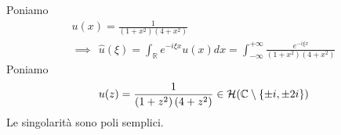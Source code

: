 Poniamo
\begin{gather*}
u( x) =\frac{1}{\left( 1+x^{2}\right)\left( 4+x^{2}\right)}\\
\implies \ \ \hat{u}( \xi ) =\int _{\mathbb{R}} e^{-i\xi x} u( x) dx=\int ^{+\infty }_{-\infty }\frac{e^{-i\xi x}}{\left( 1+x^{2}\right)\left( 4+x^{2}\right)}
\end{gather*}
Poniamo
\begin{equation*}
u( z) =\frac{1}{\left( 1+z^{2}\right)\left( 4+z^{2}\right)} \in \Hc (\mathbb{C} \setminus \{\pm i,\pm 2i\})
\end{equation*}
Le singolarità sono poli semplici.


\begin{figure}[htpb]
	\centering
{} %

\begin{tikzpicture}[x=0.75pt,y=0.75pt,yscale=-1,xscale=1]


\end{tikzpicture}
\end{figure}

